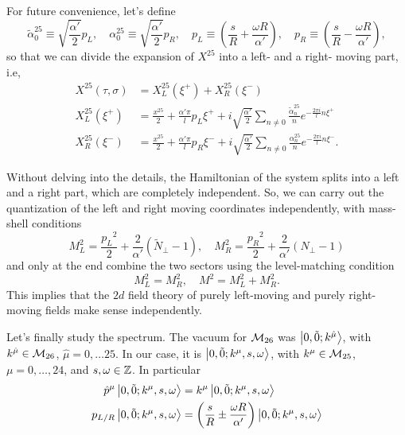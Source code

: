 For future convenience, let's define
\begin{equation}\label{eq:pl-pr-def}
    \tilde{\alpha}^{25}_0 \equiv \sqrt{\frac{\alpha'}{2}} p_L, \quad {\alpha}^{25}_0 \equiv \sqrt{\frac{\alpha'}{2}} p_R, \quad p_L \equiv \left( \frac{s}{R} + \frac{\omega R}{\alpha'} \right), \quad p_R \equiv \left( \frac{s}{R} - \frac{\omega R}{\alpha'} \right) ,
\end{equation}
so that we can divide the expansion of $X^{25}$ into a left- and a right- moving part, i.e,
\begin{subequations}\label{eq:expansion-x-25}
\begin{align}
    X^{25}(\tau,\sigma) &= X^{25}_L(\xi^+) + X^{25}_R(\xi^-) \\
    X^{25}_L(\xi^+)     &= \frac{x^{25}}{2} + \frac{\alpha' \pi}{l} p_L \xi^+ + i \sqrt{\frac{\alpha'}{2}} \sum_{n\neq 0} \frac{\tilde{\alpha}^{25}_n}{n}e^{-\frac{2\pi i}{l}n \xi^+} \\
    X^{25}_R(\xi^-)     &= \frac{x^{25}}{2} + \frac{\alpha' \pi}{l} p_R \xi^- + i \sqrt{\frac{\alpha'}{2}} \sum_{n\neq 0} \frac{{\alpha}^{25}_n}{n}e^{-\frac{2\pi i}{l}n \xi^-}.
\end{align}
\end{subequations}

Without delving into the details, the Hamiltonian of the system splits into a left and a right part, which are completely independent. So, we can carry out the quantization of the left and right moving coordinates independently, with mass-shell conditions
\begin{equation}\label{eq:left-right-mass-shell}
    M^2_L = \frac{{p_L}^2}{2} + \frac{2}{\alpha'}(\tilde{N}_\perp-1), \quad M^2_R = \frac{{p_R}^2}{2} + \frac{2}{\alpha'}({N}_\perp-1)
\end{equation}
and only at the end combine the two sectors using the level-matching condition
\begin{equation}
    M^2_L = M^2_R, \quad M^2 = M^2_L + M^2_R .
\end{equation}
This implies that the $2d$ field theory of purely left-moving and purely right-moving fields make sense independently.

Let's finally study the spectrum. The vacuum for $\mathcal{M}_{26}$ was $\ket{0,\tilde{0}; k^{\hat{\mu}}}$, with $k^{\hat{\mu}} \in \mathcal{M}_{26}$, $\hat{\mu} = 0, \dots 25$. In our case, it is $\ket{0,\tilde{0}; k^\mu, s, \omega}$, with $k^\mu \in \mathcal{M}_{25}$, $\mu = 0, \dots, 24$, and $s,\omega \in \mathbb{Z}$. In particular
\begin{equation}
\begin{aligned}
    \hat{p}^\mu \ket{0,\tilde{0}; k^\mu, s, \omega} &= k^\mu \ket{0,\tilde{0}; k^\mu, s, \omega} \\ 
    p_{L/R}\ket{0,\tilde{0}; k^\mu, s, \omega} &= \left( \frac{s}{R} \pm \frac{\omega R}{\alpha'} \right) \ket{0,\tilde{0}; k^\mu, s, \omega}
\end{aligned}
\end{equation}

